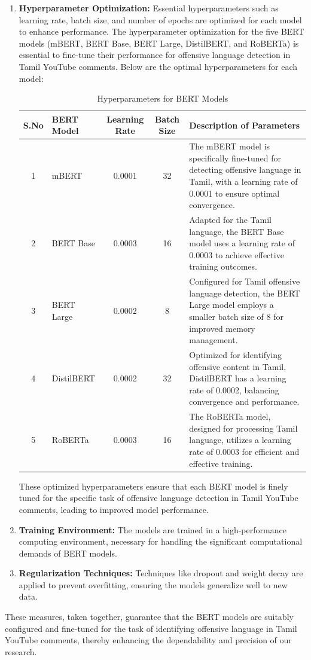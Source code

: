 \documentclass{svproc}
\begin{document}
\begin{enumerate}
    \item \textbf{Hyperparameter Optimization:} Essential hyperparameters such as learning rate, batch size, and number of epochs are optimized for each model to enhance performance.
    The hyperparameter optimization for the five BERT models (mBERT, BERT Base, BERT Large, DistilBERT, and RoBERTa) is essential to fine-tune their performance for offensive language detection in Tamil YouTube comments. Below are the optimal hyperparameters for each model:
\begin{table}[h]
\caption{Hyperparameters for BERT Models}
\centering
\begin{tabular}{|c|l|c|c|p{6cm}|}
\hline
\textbf{S.No} & \textbf{BERT Model} & \textbf{Learning Rate} & \textbf{Batch Size} & \textbf{Description of Parameters} \\
\hline
1 & mBERT & 0.0001 & 32 & The mBERT model is specifically fine-tuned for detecting offensive language in Tamil, with a learning rate of 0.0001 to ensure optimal convergence. \\
\hline
2 & BERT Base & 0.0003 & 16 & Adapted for the Tamil language, the BERT Base model uses a learning rate of 0.0003 to achieve effective training outcomes. \\
\hline
3 & BERT Large & 0.0002 & 8 & Configured for Tamil offensive language detection, the BERT Large model employs a smaller batch size of 8 for improved memory management. \\
\hline
4 & DistilBERT & 0.0002 & 32 & Optimized for identifying offensive content in Tamil, DistilBERT has a learning rate of 0.0002, balancing convergence and performance. \\
\hline
5 & RoBERTa & 0.0003 & 16 & The RoBERTa model, designed for processing Tamil language, utilizes a learning rate of 0.0003 for efficient and effective training. \\
\hline
\end{tabular}
\end{table}

These optimized hyperparameters ensure that each BERT model is finely tuned for the specific task of offensive language detection in Tamil YouTube comments, leading to improved model performance.
    \item \textbf{Training Environment:} The models are trained in a high-performance computing environment, necessary for handling the significant computational demands of BERT models.
    \item \textbf{Regularization Techniques:} Techniques like dropout and weight decay are applied to prevent overfitting, ensuring the models generalize well to new data.
\end{enumerate}
These measures, taken together, guarantee that the BERT models are suitably configured and fine-tuned for the task of identifying offensive language in Tamil YouTube comments, thereby enhancing the dependability and precision of our research.
\end{document}
